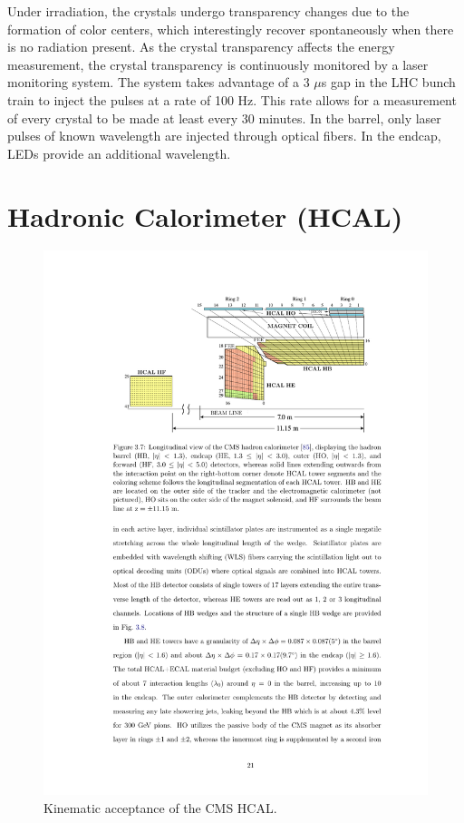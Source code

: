 Under irradiation, the crystals undergo transparency changes 
due to the formation of color centers, which interestingly recover spontaneously when there
is no radiation present. As the crystal transparency affects the energy measurement,
the crystal transparency is continuously monitored by a laser monitoring system. 
The system takes advantage of a 3 $\mu$s gap in the LHC bunch train to inject the
pulses at a rate of 100 Hz. This rate allows for a measurement of every crystal
to be made at least every 30 minutes. In the barrel, only laser
 pulses of known wavelength are injected through optical fibers. In the endcap, LEDs provide
an additional wavelength. 

\section{Hadronic Calorimeter (HCAL)}

\begin{figure}
\begin{center}
\includegraphics[width=.95\textwidth]{pics/hcal_diagram}
\end{center}
\caption{Kinematic acceptance of the CMS HCAL.}
\label{fig:hcal_diagram}
\end{figure}

